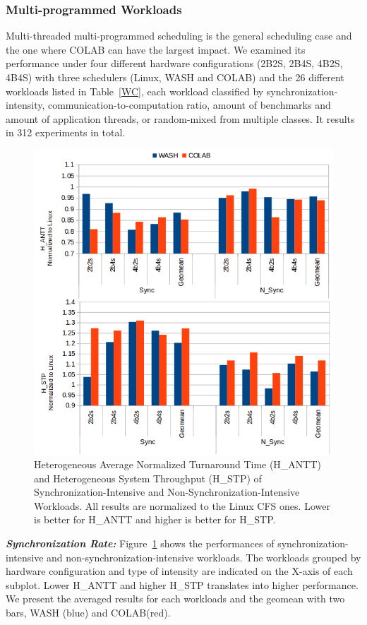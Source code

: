 \subsubsection{Multi-programmed Workloads}
Multi-threaded multi-programmed scheduling is the general scheduling case and the one where COLAB can have the largest impact. 
We examined its performance under four different hardware configurations (2B2S, 2B4S, 4B2S, 4B4S) with three schedulers (Linux, WASH and COLAB) and the 26 different workloads listed in Table~\ref{WC}, each workload classified by synchronization-intensity, communication-to-computation ratio, amount of benchmarks and amount of application threads, or random-mixed from multiple classes. It results in 312 experiments in total. 
\begin{figure}
\centering
\includegraphics[scale=0.39]{figures/sync.png}
\caption{Heterogeneous Average Normalized Turnaround Time (H\_ANTT) and Heterogeneous System Throughput (H\_STP) of Synchronization-Intensive and Non-Synchronization-Intensive Workloads. All results are normalized to the Linux CFS ones. Lower is better for H\_ANTT and higher is better for H\_STP.}
\label{sync}
\end{figure} 

\textbf{\textit{Synchronization Rate:}}
Figure~\ref{sync} shows the performances of synchronization-intensive and non-synchronization-intensive workloads. The workloads grouped by hardware configuration and type of intensity are indicated on the X-axis of each subplot. Lower H\_ANTT and higher H\_STP translates into higher performance. We present the averaged results for each workloads and the geomean with two bars, WASH (blue) and COLAB(red).

